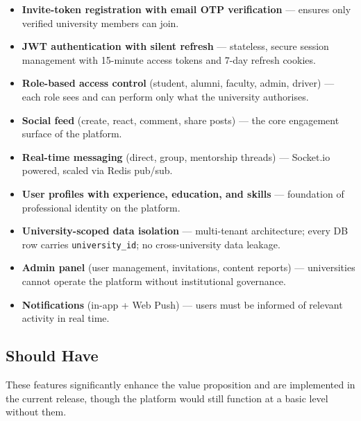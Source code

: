 \documentclass[12pt, a4paper]{article}
\begin{document}
\begin{itemize}
    \item \textbf{Invite-token registration with email OTP verification} --- ensures
    only verified university members can join.
    \item \textbf{JWT authentication with silent refresh} --- stateless, secure session
    management with 15-minute access tokens and 7-day refresh cookies.
    \item \textbf{Role-based access control} (student, alumni, faculty, admin, driver)
    --- each role sees and can perform only what the university authorises.
    \item \textbf{Social feed} (create, react, comment, share posts) --- the core
    engagement surface of the platform.
    \item \textbf{Real-time messaging} (direct, group, mentorship threads) ---
    Socket.io powered, scaled via Redis pub/sub.
    \item \textbf{User profiles with experience, education, and skills} --- foundation
    of professional identity on the platform.
    \item \textbf{University-scoped data isolation} --- multi-tenant architecture;
    every DB row carries \texttt{university\_id}; no cross-university data leakage.
    \item \textbf{Admin panel} (user management, invitations, content reports) ---
    universities cannot operate the platform without institutional governance.
    \item \textbf{Notifications} (in-app + Web Push) --- users must be informed of
    relevant activity in real time.
\end{itemize}

\subsection{Should Have}

These features significantly enhance the value proposition and are implemented in the
current release, though the platform would still function at a basic level without them.
\end{document}
